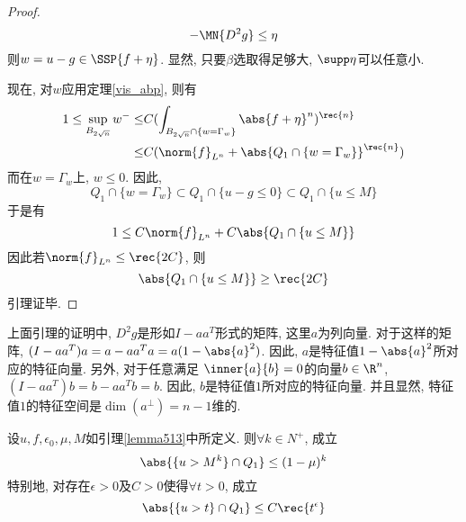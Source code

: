 \begin{proof}
    \begin{equation}
        -\MN{D^2g} \le \eta
    \end{equation}
    则$w=u-g \in \SSP{f+\eta}$.  显然, 只要$\beta$选取得足够大, $\supp \eta$可以任意小.  
    \par 现在, 对$w$应用定理\eqref{vis_abp}, 则有
    \begin{equation}
        \begin{split}
        1 \le \sup_{B_{2\sqrt{n}}}w^- \le & C(\int_{B_{2\sqrt{n}} \cap \{w=\Gamma_w\}} \abs{f+\eta}^n)^\rec{n} \\
         \le & C(\norm{f}_{L^n}+\abs{Q_1 \cap \{w=\Gamma_w\}}^\rec{n})
        \end{split}
    \end{equation}
    而在$w=\Gamma_w$上, $w \le 0$.  因此, 
    \begin{equation}
        Q_1 \cap \{w=\Gamma_w\} \subset Q_1 \cap \{ u-g \le 0\} \subset Q_1 \cap \{u \le M\}
    \end{equation}
    于是有
    \begin{equation}
        1 \le C\norm{f}_{L^n} + C\abs{Q_1\cap \{u \le M\}}
    \end{equation}
    因此若$\norm{f}_{L^n} \le \rec{2C}$, 则
    \begin{equation}
        \abs{ Q_1 \cap \{u \le M\}} \ge \rec{2C}
    \end{equation}
    引理证毕.  
\end{proof}
\begin{remark}
    上面引理的证明中, $D^2g$是形如$I-aa^T$形式的矩阵, 这里$a$为列向量.  对于这样的矩阵, $(I-aa^T)a=a-aa^Ta=a(1-\abs{a}^2)$.  因此, $a$是特征值$1-\abs{a}^2$所对应的特征向量.  另外, 对于任意满足 $\inner{a}{b}=0$的向量$b \in \R^n$, $(I-aa^T)b=b-aa^Tb=b$.  因此, $b$是特征值$1$所对应的特征向量.  并且显然, 特征值$1$的特征空间是$\dim(a^{\perp})=n-1$维的.  
\end{remark}
\begin{lemma} \label{lemma514}
    设$u , f, \epsilon_0, \mu, M$如引理\eqref{lemma513}中所定义.  则$\forall k \in N^+$, 成立
    \begin{equation}
        \abs{\{u > M^k\} \cap Q_1} \le (1-\mu)^k
    \end{equation}
    特别地, 对存在$\epsilon >0$及$C>0$使得$\forall t>0$, 成立
    \begin{equation}
        \abs{\{u>t\} \cap Q_1} \le C\rec{t^\epsilon}
    \end{equation}
\end{lemma}
